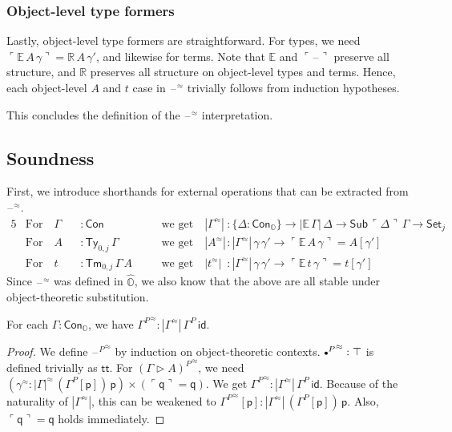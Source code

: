 \documentclass[acmsmall]{acmart}
\newcommand{\msf}[1]{\mathsf{#1}}
\newcommand{\mbb}[1]{\mathbb{#1}}
\newcommand{\ext}{\triangleright}
\newcommand{\mbbo}{\mbb{O}}
\newcommand{\Con}{\msf{Con}}
\newcommand{\Sub}{\msf{Sub}}
\newcommand{\Ty}{\msf{Ty}}
\newcommand{\Tm}{\msf{Tm}}
\newcommand{\Cono}{\msf{Con}_{\mbbo}}
\newcommand{\p}{\mathsf{p}}
\newcommand{\q}{\mathsf{q}}
\renewcommand{\tt}{\msf{tt}}
\newcommand{\emptycon}{\scaleobj{.75}\bullet}
\newcommand{\id}{\msf{id}}
\newcommand{\Set}{\mathsf{Set}}
\newcommand{\blank}{{\mathord{\hspace{1pt}\text{--}\hspace{1pt}}}}
\newcommand{\emb}[1]{\ulcorner#1\urcorner}
\newcommand{\hato}{\bm\hat{\mbbo}}
\newcommand{\ev}{\mbb{E}}
\newcommand{\re}{\mbb{R}}
\theoremstyle{remark}
\newcommand{\rel}{^{\approx}}
\begin{document}
\subsubsection{Object-level type formers}
Lastly, object-level type formers are straightforward. For types, we need
$\emb{\ev\,A\,\gamma} = \re\,A\,\gamma'$, and likewise for terms. Note that
$\ev$ and $\emb{\blank}$ preserve all structure, and $\re$ preserves all
structure on object-level types and terms. Hence, each object-level $A$ and $t$
case in $\blank\rel$ trivially follows from induction hypotheses.

This concludes the definition of the $\blank\rel$ interpretation.

\subsection{Soundness}

\begin{definition} First, we introduce shorthands for
external operations that can be extracted from $\blank\rel$.
\begin{alignat*}{5}
  & \text{For}\hspace{1em} \Gamma &&: \Con \hspace{1em}&&\text{we get}\hspace{1em}
         |\Gamma\rel| &&: \{\Delta : \Cono\} \to |\ev\,\Gamma|\,\Delta \to \Sub\,\emb{\Delta}\,\Gamma \to \Set_j\\
  & \text{For}\hspace{1em} A &&: \Ty_{0,j}\,\Gamma \hspace{1em}&&\text{we get}\hspace{1em} |A\rel| &&: |\Gamma\rel|\,\gamma\,\gamma' \to \emb{\ev\,A\,\gamma} = A[\gamma']\\
  & \text{For}\hspace{1em} t &&: \Tm_{0,j}\,\Gamma\,A \hspace{1em}&&\text{we get}\hspace{1em}|t\rel| &&: |\Gamma\rel|\,\gamma\,\gamma' \to \emb{\ev\,t\,\gamma} = t[\gamma']
\end{alignat*}
Since $\blank\rel$ was defined in $\hato$, we also know that the above are all
stable under object-theoretic substitution.
\end{definition}

\begin{theorem}
For each $\Gamma : \Cono$, we have ${\Gamma^P}\rel : |\Gamma\rel|\,\Gamma^P\,\id$.
\end{theorem}
\begin{proof}
We define ${\blank^P}\rel$ by induction on object-theoretic contexts.
${\emptycon^P}\rel : \top$ is defined trivially as $\tt$. For ${(\Gamma \ext
  A)^P}\rel$, we need $(\gamma\rel : |\Gamma|\rel\,(\Gamma^P[\p])\,\p) \times
(\emb{\q} = \q)$. We get ${\Gamma^P}\rel : |\Gamma\rel|\,\Gamma^P\,\id$. Because
of the naturality of $|\Gamma\rel|$, this can be weakened to ${\Gamma^P}\rel[\p]
: |\Gamma\rel|\,(\Gamma^P[\p])\,\p$. Also, $\emb{\q} = \q$ holds immediately.
\end{proof}
\end{document}
